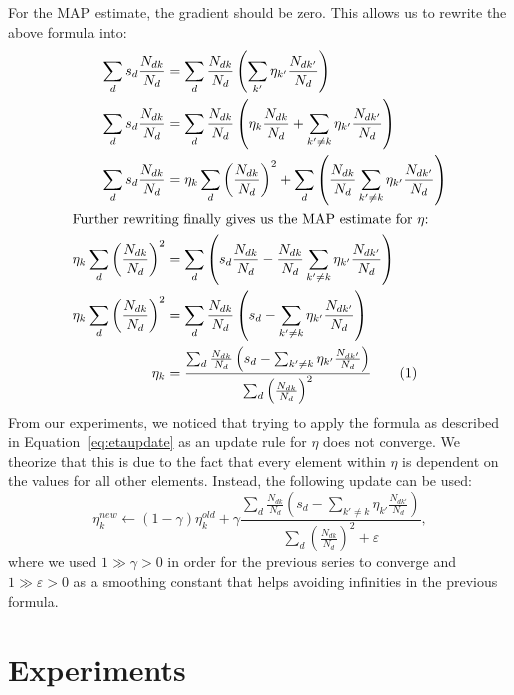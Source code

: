 \documentclass{article} %
\renewcommand{\epsilon}{\varepsilon}
\newcommand{\numberthis}{\addtocounter{equation}{1}\tag{\theequation}}
\begin{document}
For the MAP estimate, the gradient should be zero.
This allows us to rewrite the above formula into:
\begin{align*}
\sum_d s_d \frac{N_{dk}}{N_d} &= \sum_d \frac{N_{dk}}{N_d} \left( \sum_{k'} \eta_{k'} \frac{N_{dk'}}{N_d} \right)\\
\sum_d s_d \frac{N_{dk}}{N_d} &= \sum_d \frac{N_{dk}}{N_d} \left( \eta_k \frac{N_{dk}}{N_d} + \sum_{k' \ne k} \eta_{k'} \frac{N_{dk'}}{N_d} \right) \\
\sum_d s_d \frac{N_{dk}}{N_d} &= \eta_k \sum_d \left( \frac{N_{dk}}{N_d}  \right)^2 + \sum_d \left( \frac{N_{dk}}{N_d} \sum_{k' \ne k} \eta_{k'} \frac{N_{dk'}}{N_d} \right) \\
\intertext{Further rewriting finally gives us the MAP estimate for \(\eta\):}
\eta_k \sum_d \left( \frac{N_{dk}}{N_d}  \right)^2  &=\sum_d \left( s_d \frac{N_{dk}}{N_d} - \frac{N_{dk}}{N_d} \sum_{k' \ne k} \eta_{k'} \frac{N_{dk'}}{N_d} \right)\\
\eta_k \sum_d \left( \frac{N_{dk}}{N_d}  \right)^2 &=  \sum_d \frac{N_{dk}}{N_d} \left( s_d - \sum_{k' \ne k} \eta_{k'} \frac{N_{dk'}}{N_d} \right)\\
\eta_k &= \frac{\sum_d \frac{N_{dk}}{N_d} \left( s_d - \sum_{k' \ne k} \eta_{k'} \frac{N_{dk'}}{N_d} \right)}{\sum_d \left( \frac{N_{dk}}{N_d}  \right)^2} \numberthis \label{eq:etaupdate}
\end{align*}
From our experiments, we noticed that trying to apply the formula as described in Equation~\ref{eq:etaupdate} as an update rule for \(\eta\) does not converge. We theorize that this is due to the fact that every element within $\eta$ is dependent on the values for all other elements.
Instead, the following update can be used:
\begin{equation}
\eta_k^{new} \leftarrow (1 - \gamma) \eta_k^{old} + \gamma \frac{\sum_d \frac{N_{dk}}{N_d} \left( s_d - \sum_{k' \ne k} \eta_{k'} \frac{N_{dk'}}{N_d} \right)}{\sum_d \left( \frac{N_{dk}}{N_d}  \right)^2 + \epsilon},
\end{equation}
where we used $1 \gg \gamma > 0$ in order for the previous series to converge and $1 \gg \epsilon > 0$ as a smoothing constant that helps avoiding infinities in the previous formula.

\section{Experiments}
\label{sec:experiments}
\end{document}
